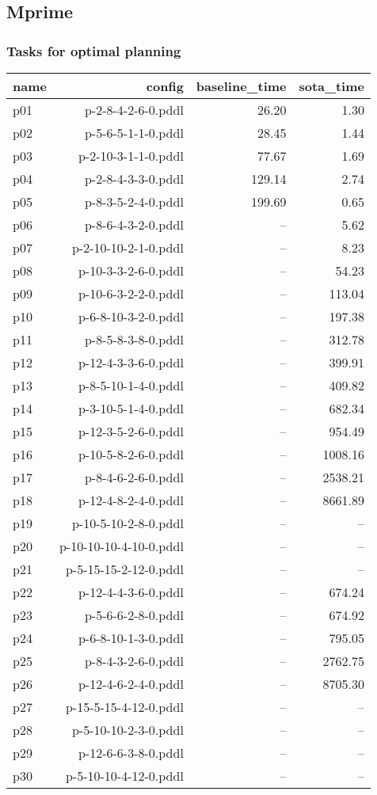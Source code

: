 \documentclass{article}
\begin{document}
                \newpage \subsection{Mprime}
                    \subsubsection*{Tasks for optimal planning}
                    
                            \begin{center}
                            \scriptsize
                            \begin{tabular}{@{}l|r|r|r@{}}
                            name & config & baseline\_time & sota\_time\\\midrule
                              p01& p-2-8-4-2-6-0.pddl&26.20&1.30\\
  p02& p-5-6-5-1-1-0.pddl&28.45&1.44\\
  p03& p-2-10-3-1-1-0.pddl&77.67&1.69\\
  p04& p-2-8-4-3-3-0.pddl&129.14&2.74\\
  p05& p-8-3-5-2-4-0.pddl&199.69&0.65\\
  p06& p-8-6-4-3-2-0.pddl&--&5.62\\
  p07& p-2-10-10-2-1-0.pddl&--&8.23\\
  p08& p-10-3-3-2-6-0.pddl&--&54.23\\
  p09& p-10-6-3-2-2-0.pddl&--&113.04\\
  p10& p-6-8-10-3-2-0.pddl&--&197.38\\
  p11& p-8-5-8-3-8-0.pddl&--&312.78\\
  p12& p-12-4-3-3-6-0.pddl&--&399.91\\
  p13& p-8-5-10-1-4-0.pddl&--&409.82\\
  p14& p-3-10-5-1-4-0.pddl&--&682.34\\
  p15& p-12-3-5-2-6-0.pddl&--&954.49\\
  p16& p-10-5-8-2-6-0.pddl&--&1008.16\\
  p17& p-8-4-6-2-6-0.pddl&--&2538.21\\
  p18& p-12-4-8-2-4-0.pddl&--&8661.89\\
  p19& p-10-5-10-2-8-0.pddl&--&--\\
  p20& p-10-10-10-4-10-0.pddl&--&--\\
  p21& p-5-15-15-2-12-0.pddl&--&--\\
  p22& p-12-4-4-3-6-0.pddl&--&674.24\\
  p23& p-5-6-6-2-8-0.pddl&--&674.92\\
  p24& p-6-8-10-1-3-0.pddl&--&795.05\\
  p25& p-8-4-3-2-6-0.pddl&--&2762.75\\
  p26& p-12-4-6-2-4-0.pddl&--&8705.30\\
  p27& p-15-5-15-4-12-0.pddl&--&--\\
  p28& p-5-10-10-2-3-0.pddl&--&--\\
  p29& p-12-6-6-3-8-0.pddl&--&--\\
  p30& p-5-10-10-4-12-0.pddl&--&--
                            \end{tabular}
                            \end{center}
                    
\end{document}
